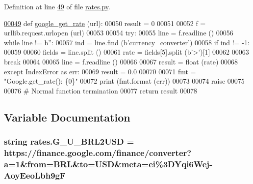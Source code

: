 Definition at line \hyperlink{rates_8py_source_l00049}{49} of file \hyperlink{rates_8py_source}{rates.\+py}.


\begin{DoxyCode}
\hypertarget{namespacerates.tex_l00049}{}\hyperlink{namespacerates_a2819015de60b5745e06ed3d266d26d6b}{00049} \textcolor{keyword}{def }\hyperlink{namespacerates_a2819015de60b5745e06ed3d266d26d6b}{google\_get\_rate} (url):
00050     result = 0
00051 
00052     f = urllib.request.urlopen (url)
00053     
00054     \textcolor{keywordflow}{try}:
00055         line = f.readline ()
00056         \textcolor{keywordflow}{while} line != b\textcolor{stringliteral}{''}:
00057             ind = line.find (b\textcolor{stringliteral}{'currency\_converter'})
00058             \textcolor{keywordflow}{if} ind != -1:
00059                 
00060                 fields = line.split ()
00061                 rate = fields[5].split (b\textcolor{stringliteral}{'>'})[1]
00062                 
00063                 \textcolor{keywordflow}{break}
00064                 
00065             line = f.readline ()
00066         
00067         result = float (rate)
00068     \textcolor{keywordflow}{except} IndexError \textcolor{keyword}{as} err:
00069         result = 0.0
00070         
00071         fmt = \textcolor{stringliteral}{"Google.get\_rate(): \{0\}"}
00072         \textcolor{keywordflow}{print} (fmt.format (err))
00073         
00074         \textcolor{keywordflow}{raise}
00075     
00076     \textcolor{comment}{# Normal function termination}
00077     \textcolor{keywordflow}{return} result
00078 
\end{DoxyCode}


\subsection{Variable Documentation}
\subsubsection[{\texorpdfstring{G\+\_\+\+U\+\_\+\+B\+R\+L2\+U\+SD}{G_U_BRL2USD}}]{\setlength{\rightskip}{0pt plus 5cm}string rates.\+G\+\_\+\+U\+\_\+\+B\+R\+L2\+U\+SD = \textquotesingle{}https\+://finance.\+google.\+com/finance/converter?a=1\&from=B\+RL\&to=U\+SD\&meta=ei\%3\+D\+Yqi6\+Wej-\/\+Aoy\+Eeo\+Lbh9g\+F\textquotesingle{}}\hypertarget{namespacerates_a4b516d1323011d86ff6aef5851ec8fcf}{}\label{namespacerates_a4b516d1323011d86ff6aef5851ec8fcf}



